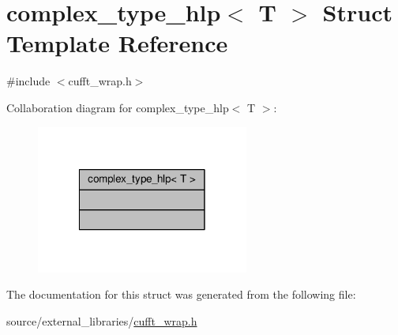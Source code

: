 \hypertarget{structcomplex__type__hlp}{\section{complex\-\_\-type\-\_\-hlp$<$ T $>$ Struct Template Reference}
\label{structcomplex__type__hlp}
}


{\ttfamily \#include $<$cufft\-\_\-wrap.\-h$>$}



Collaboration diagram for complex\-\_\-type\-\_\-hlp$<$ T $>$\-:\nopagebreak
\begin{figure}[H]
\begin{center}
\leavevmode
\includegraphics[width=198pt]{structcomplex__type__hlp__coll__graph}
\end{center}
\end{figure}


The documentation for this struct was generated from the following file\-:\begin{DoxyCompactItemize}
\item 
source/external\-\_\-libraries/\hyperlink{cufft__wrap_8h}{cufft\-\_\-wrap.\-h}\end{DoxyCompactItemize}
